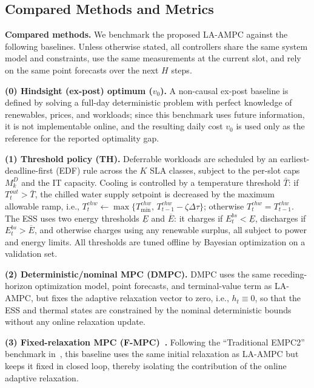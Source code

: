\documentclass[a4paper,fleqn]{cas-dc}
\theoremstyle{plain}
\theoremstyle{remark}
\theoremstyle{plain}
\begin{document}
\subsection{Compared Methods and Metrics}
\noindent\textbf{Compared methods.}
We benchmark the proposed LA-AMPC against the following baselines.
Unless otherwise stated, all controllers share the same system model and constraints, use the same measurements at the
current slot, and rely on the same point forecasts over the next $H$ steps.

\noindent\textbf{(0) Hindsight (ex-post) optimum ($v_0$).}
A non-causal ex-post baseline is defined by solving a full-day deterministic problem with perfect knowledge of renewables, prices, and workloads; since this benchmark uses future information, it is not implementable online, and the resulting daily cost $v_0$ is used only as the reference for the reported optimality gap.

\noindent\textbf{(1) Threshold policy (TH).}
Deferrable workloads are scheduled by an earliest-deadline-first (EDF) rule across the $K$ SLA classes, subject to the per-slot caps $M_k^D$ and the IT capacity.
Cooling is controlled by a temperature threshold $\bar{T}$: if $T_t^{out}>\bar{T}$, the chilled water supply setpoint is decreased by the maximum allowable ramp, i.e., $T_t^{chw}\leftarrow\max\{T_{\min}^{chw},\,T_{t-1}^{chw}-\zeta\Delta\tau\}$; otherwise $T_t^{chw}=T_{t-1}^{chw}$.
The ESS uses two energy thresholds $\underline{E}$ and $\overline{E}$: it charges if $E_t^{bs}<\underline{E}$, discharges if $E_t^{bs}>\overline{E}$, and otherwise charges using any renewable surplus, all subject to power and energy limits.
All thresholds are tuned offline by Bayesian optimization on a validation set.

\noindent\textbf{(2) Deterministic/nominal MPC (DMPC).}
DMPC uses the same receding-horizon optimization model, point forecasts, and terminal-value term as LA-AMPC, but fixes the adaptive relaxation vector to zero, i.e., $h_t\equiv 0$, so that the ESS and thermal states are constrained by the nominal deterministic bounds without any online relaxation update.

\noindent\textbf{(3) Fixed-relaxation MPC (F-MPC)~\cite{ghosh2025_adaptive_relaxation_ccsmpc}.}
Following the ``Traditional EMPC2'' benchmark in~\cite{ghosh2025_adaptive_relaxation_ccsmpc}, this baseline uses the same initial relaxation as LA-AMPC but keeps it fixed in closed loop, thereby isolating the contribution of the online adaptive relaxation.
\end{document}

